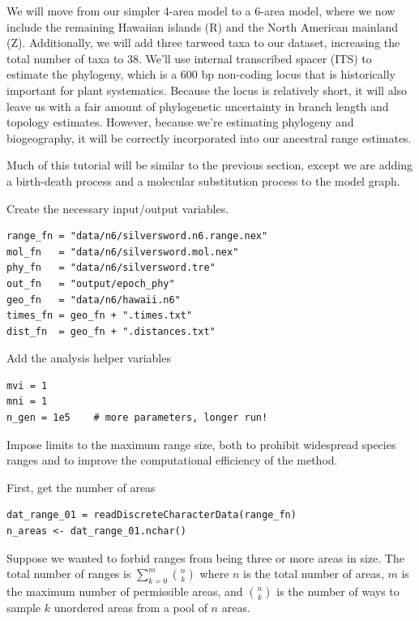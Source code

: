 We will move from our simpler 4-area model to a 6-area model, where we now include the remaining Hawaiian islands (R) and the North American mainland (Z).
Additionally, we will add three tarweed taxa to our dataset, increasing the total number of taxa to 38.
We'll use internal transcribed spacer (ITS) to estimate the phylogeny, which is a 600 bp non-coding locus that is historically important for plant systematics.
Because the locus is relatively short, it will also leave us with a fair amount of phylogenetic uncertainty in branch length and topology estimates.
However, because we're estimating phylogeny and biogeography, it will be correctly incorporated into our ancestral range estimates.


Much of this tutorial will be similar to the previous section, except we are adding a birth-death process and a molecular substitution process to the model graph.

Create the necessary input/output variables.

\begin{snugshade}
\begin{lstlisting}
range_fn = "data/n6/silversword.n6.range.nex"
mol_fn   = "data/n6/silversword.mol.nex"
phy_fn   = "data/n6/silversword.tre"
out_fn   = "output/epoch_phy"
geo_fn   = "data/n6/hawaii.n6"
times_fn = geo_fn + ".times.txt"
dist_fn  = geo_fn + ".distances.txt"
\end{lstlisting}
\end{snugshade}

Add the analysis helper variables

\begin{snugshade}
\begin{lstlisting}
mvi = 1
mni = 1
n_gen = 1e5    # more parameters, longer run!
\end{lstlisting}
\end{snugshade}


Impose limits to the maximum range size, both to prohibit widespread species ranges and to improve the computational efficiency of the method.

First, get the number of areas
\begin{snugshade}
\begin{lstlisting}
dat_range_01 = readDiscreteCharacterData(range_fn)
n_areas <- dat_range_01.nchar()
\end{lstlisting}
\end{snugshade}

Suppose we wanted to forbid ranges from being three or more areas in size.
The total number of ranges is $\sum_{k=0}^m {{n}\choose{k}}$ where $n$ is the total number of areas, $m$ is the maximum number of permissible areas, and ${{n}\choose{k}}$ is the number of ways to sample $k$ unordered areas from a pool of $n$ areas.


